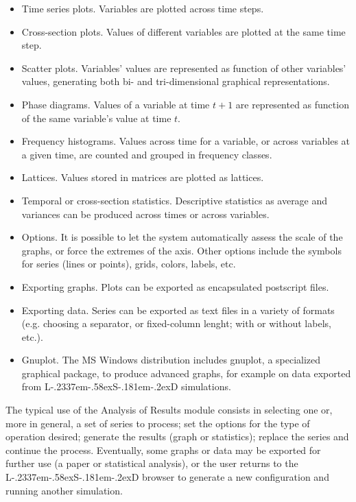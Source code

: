 \documentclass [11pt,a4paper] {book}
\def\LsD{{L\kern-.2337em\lower-.58ex\hbox{S}\kern-.181em\lower-.2ex\hbox{D}}\xspace}
\begin{document}
\begin{itemize}
	\item Time series plots. Variables are plotted across time steps.
	
	\item Cross-section plots. Values of different variables are plotted at the same time step.
	
	\item Scatter plots. Variables' values are represented as function of other variables' values, generating both bi- and tri-dimensional graphical representations.

	\item Phase diagrams. Values of a variable at time $t+1$ are represented as function of the same variable's value at time $t$.
	
	\item Frequency histograms. Values across time for a variable, or across variables at a given time, are counted and grouped in frequency classes.
	
	\item Lattices. Values stored in matrices are plotted as lattices.
	
	\item Temporal or cross-section statistics. Descriptive statistics as average and variances can be produced across times or across variables.
	
	\item Options. It is possible to let the system automatically assess the scale of the graphs, or force the extremes of the axis. Other options include the symbols for series (lines or points), grids, colors, labels, etc.
	
	\item Exporting graphs. Plots can be exported as encapsulated postscript files.
	
	\item Exporting data. Series can be exported as text files in a variety of formats (e.g. choosing a separator, or fixed-column lenght; with or without labels, etc.).
	
	\item Gnuplot. The MS Windows distribution includes gnuplot, a specialized graphical package, to produce advanced graphs, for example on data exported from \LsD simulations.
\end{itemize}



The typical use of the Analysis of Results module consists in selecting one or, more in general, a set of series to process; set the options for the type of operation desired; generate the results (graph or statistics); replace the series and continue the process. Eventually, some graphs or data may be exported for further use (a paper or statistical analysis), or the user returns to the \LsD browser to generate a new configuration and running another simulation.
\end{document}
